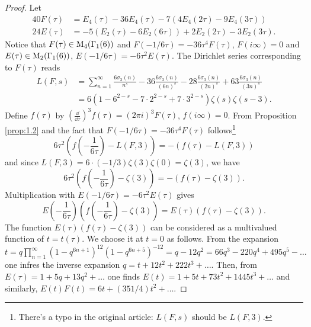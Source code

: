 \begin{proof}
    Let
    \begin{align*}
        40 F(\tau) &= E_4(\tau) - 36 E_4(\tau) - 7 (4E_4(2\tau) - 9E_4(3\tau)) \\
        24 E(\tau) &= -5(E_2(\tau) - 6E_2(6\tau)) + 2E_2(2\tau) - 3E_2(3\tau).
    \end{align*}
    Notice that $F(\tau) \in \mathrm{M}_4(\Gamma_1(6))$ and $F(-1/6\tau) = -36 \tau^4 F(\tau)$, $F(i\infty) = 0$ and $E(\tau) \in \mathrm{M}_2(\Gamma_1(6))$, $E(-1/6\tau) =  - 6\tau^2 E(\tau)$.
    The Dirichlet series corresponding to $F(\tau)$ reads
    \begin{align*}
        L(F, s) &= \sum_{n=1}^{\infty} \frac{6\sigma_3(n)}{n^s} - 36 \frac{6 \sigma_3(n)}{(6n)^s} - 28 \frac{6 \sigma_3(n)}{(2n)^s} + 63 \frac{6 \sigma_3(n)}{(3n)^s} \\
        &= 6(1 - 6^{2-s} - 7 \cdot 2^{2-s} + 7 \cdot 3^{2-s}) \zeta(s) \zeta(s - 3).
    \end{align*}
    Define $f(\tau)$ by $(\frac{\dd}{\dd \tau})^{3} f(\tau) = (2 \pi i )^{3} F(\tau)$, $f(i \infty) = 0$.
    From Proposition \ref{prop:1.2} and the fact that $F(-1/6\tau) = -36 \tau^4 F(\tau)$ follows\footnote{There's a typo in the original article: $L(F, s)$ should be $L(F, 3)$.}
    $$
        6 \tau^2 \left(f\left(-\frac{1}{6\tau}\right) - L(F, 3)\right) = -(f(\tau) - L(F, 3))
    $$
    and since $L(F, 3) = 6 \cdot (-1/3) \zeta(3) \zeta(0) = \zeta(3)$, we have
    $$
        6 \tau^2 \left(f\left(-\frac{1}{6\tau}\right) - \zeta(3)\right) = -(f(\tau) - \zeta(3)).
    $$
    Multiplication with $E(-1/6\tau) = -6\tau^2 E(\tau)$ gives
    \begin{equation}
        \label{eqn:2}
        E\left(-\frac{1}{6\tau}\right) \left(f\left(-\frac{1}{6 \tau}\right) - \zeta(3)\right) = E(\tau) (f(\tau) - \zeta(3)).
    \end{equation}
    The function $E(\tau)(f(\tau) - \zeta(3))$ can be considered as a multivalued function of $t = t(\tau)$.
    We choose it at $t = 0$ as follows.
    From the expansion $t = q\prod_{n=1}^{\infty} (1 - q^{6n + 1})^{12} (1 - q^{6n + 5})^{-12} = q - 12q^2 = 66q^3 - 220q^4 + 495 q^5 - \dots$ one infres the inverse expansion $q = t + 12 t^2 + 222 t^3 + \dots$.
    Then, from $E(\tau) = 1 + 5q + 13 q^2 + \dots$ one finds $E(t) = 1 + 5t + 73 t^2 + 1445 t^3 + \dots$ and similarly, $E(t) F(t) = 6t + (351/4)t^2 + \dots$.


\end{proof}
